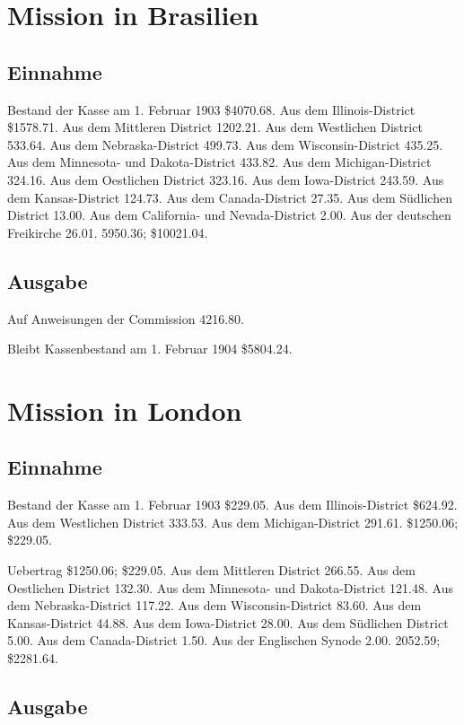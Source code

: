 \section{Mission in Brasilien}

\subsection{Einnahme}

Bestand der Kasse am 1. Februar 1903 \$4070.68. Aus dem Illinois-District \$1578.71. Aus dem Mittleren District 1202.21. Aus dem Westlichen District 533.64. Aus dem Nebraska-District 499.73. Aus dem Wisconsin-District 435.25. Aus dem Minnesota- und Dakota-District 433.82. Aus dem Michigan-District 324.16. Aus dem Oestlichen District 323.16. Aus dem Iowa-District 243.59. Aus dem Kansas-District 124.73. Aus dem Canada-District 27.35. Aus dem Südlichen District 13.00. Aus dem California- und Nevada-District 2.00. Aus der deutschen Freikirche 26.01. 5950.36; \$10021.04.

\subsection{Ausgabe}

Auf Anweisungen der Commission 4216.80.

Bleibt Kassenbestand am 1. Februar 1904 \$5804.24.

\section{Mission in London}

\subsection{Einnahme}

Bestand der Kasse am 1. Februar 1903 \$229.05. Aus dem Illinois-District \$624.92. Aus dem Westlichen District 333.53. Aus dem Michigan-District 291.61. \$1250.06; \$229.05.

Uebertrag \$1250.06; \$229.05. Aus dem Mittleren District 266.55. Aus dem Oestlichen District 132.30. Aus dem Minnesota- und Dakota-District 121.48. Aus dem Nebraska-District 117.22. Aus dem Wisconsin-District 83.60. Aus dem Kansas-District 44.88. Aus dem Iowa-District 28.00. Aus dem Südlichen District 5.00. Aus dem Canada-District 1.50. Aus der Englischen Synode 2.00. 2052.59; \$2281.64.

\subsection{Ausgabe}


